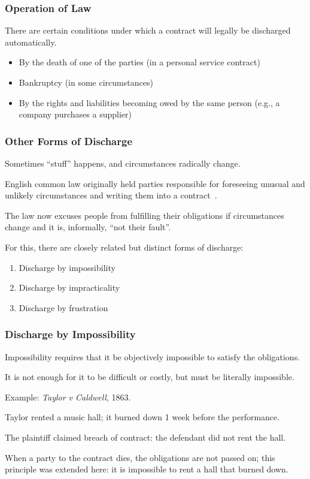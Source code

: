 \begin{frame}
\frametitle{Operation of Law}

There are certain conditions under which a contract will legally be discharged automatically.

\begin{itemize}
	\item By the death of one of the parties (in a personal service contract)
	\item Bankruptcy (in some circumstances)
	\item By the rights and liabilities becoming owed by the same person (e.g., a company purchases a supplier)
\end{itemize}

\end{frame}



\begin{frame}
\frametitle{Other Forms of Discharge}

Sometimes ``stuff'' happens, and circumstances radically change.

English common law originally held parties responsible for foreseeing unusual and unlikely circumstances and writing them into a contract~\cite{lba}.

The law now excuses people from fulfilling their obligations if circumstances change and it is, informally, ``not their fault''.

For this, there are closely related but distinct forms of discharge:

\begin{enumerate}
	\item Discharge by impossibility
	\item Discharge by impracticality
	\item Discharge by frustration
\end{enumerate}

\end{frame}



\begin{frame}
\frametitle{Discharge by Impossibility}

Impossibility requires that it be objectively impossible to satisfy the obligations.

It is not enough for it to be difficult or costly, but must be literally impossible.

Example: \textit{Taylor v Caldwell}, 1863.

Taylor rented a music hall; it burned down 1 week before the performance.

The plaintiff claimed breach of contract: the defendant did not rent the hall.

When a party to the contract dies, the obligations are not passed on; this principle was extended here: it is impossible to rent a hall that burned down.

\end{frame}



